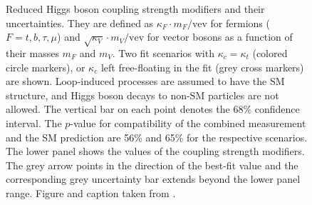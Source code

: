 \begin{figure}
    \caption{
      Reduced Higgs boson coupling strength modifiers and their uncertainties. They are defined as $\kappa_F \cdot m_F / \text{vev}$ for fermions
  ($F=t,b,\tau,\mu$) and $\sqrt{\kappa_V}\cdot m_V/\text{vev}$ for vector bosons as a
  function of their masses $m_F$ and $m_V$. Two fit scenarios with $\kappa_c =
  \kappa_t$ (colored circle markers), or $\kappa_c$ left free-floating in the fit (grey
  cross markers) are shown. Loop-induced processes are assumed to have the SM structure, and Higgs boson decays to non-SM particles are not allowed. The vertical bar on each point denotes the 68\% confidence interval. The $p$-value for compatibility of the combined measurement and the SM prediction are 56\% and 65\% for the respective scenarios. The lower panel shows the values of the coupling strength modifiers. The grey arrow points in the direction of the best-fit value and the corresponding grey uncertainty bar extends beyond the lower panel range. Figure and caption taken from .}
    \label{fig:h-couplings}
\end{figure}